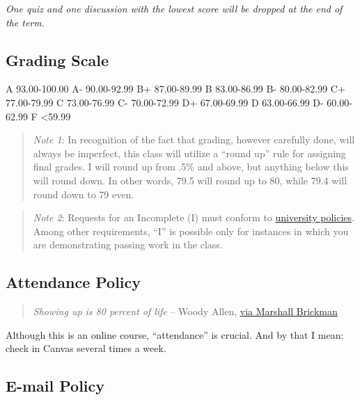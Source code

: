 \documentclass[11pt,]{article}
\begin{document}
\emph{One quiz and one discussion with the lowest score will be dropped
at the end of the term}.

\hypertarget{grading-scale}{%
\subsection{Grading Scale}\label{grading-scale}}

A 93.00-100.00 \textbar{} A- 90.00-92.99 B+ 87.00-89.99 \textbar{} B
83.00-86.99 \textbar{} B- 80.00-82.99 C+ 77.00-79.99 \textbar{} C
73.00-76.99 \textbar{} C- 70.00-72.99 D+ 67.00-69.99 \textbar{} D
63.00-66.99 \textbar{} D- 60.00-62.99 F \textless59.99

\begin{quote}
\emph{Note 1}: In recognition of the fact that grading, however
carefully done, will always be imperfect, this class will utilize a
``round up'' rule for assigning final grades. I will round up from .5\%
and above, but anything below this will round down. In other words, 79.5
will round up to 80, while 79.4 will round down to 79 even.
\end{quote}

\begin{quote}
\emph{Note 2}: Requests for an Incomplete (I) must conform to
\href{https://bit.ly/3bDxwZi}{university policies}. Among other
requirements, ``I'' is possible only for instances in which you are
demonstrating passing work in the class.
\end{quote}

\hypertarget{attendance-policy}{%
\subsection{Attendance Policy}\label{attendance-policy}}

\begin{quote}
\emph{Showing up is 80 percent of life} -- Woody Allen,
\href{http://quoteinvestigator.com/2013/06/10/showing-up/\#note-6553-1}{via
Marshall Brickman}
\end{quote}

Although this is an online course, ``attendance'' is crucial. And by
that I mean: check in Canvas several times a week.

\hypertarget{email-policy}{%
\subsection{E-mail Policy}\label{email-policy}}
\end{document}
